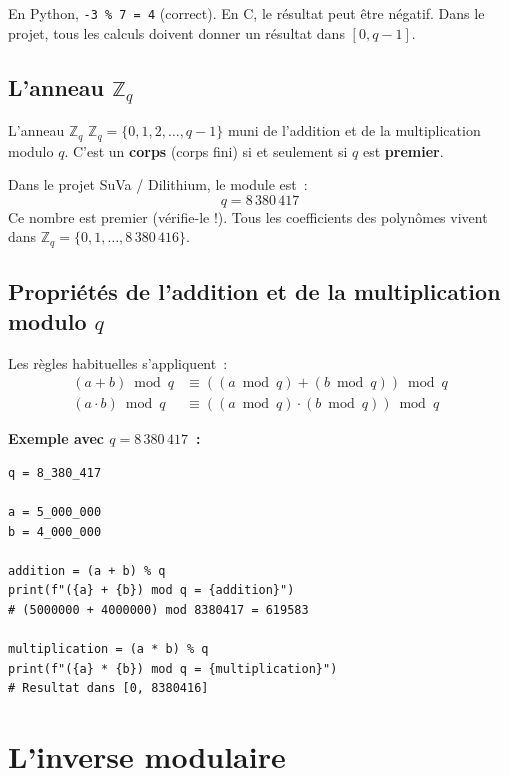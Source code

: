\documentclass[12pt, a4paper]{article}
\begin{document}
\begin{warningbox}
En Python, \texttt{-3 \% 7 = 4} (correct). En C, le résultat peut être négatif.
Dans le projet, tous les calculs doivent donner un résultat dans $[0, q-1]$.
\end{warningbox}

\subsection{L'anneau $\mathbb{Z}_q$}

\begin{defbox}{L'anneau $\mathbb{Z}_q$}
$\mathbb{Z}_q = \{0, 1, 2, \ldots, q-1\}$ muni de l'addition et de la
multiplication modulo $q$. C'est un \textbf{corps} (corps fini) si et
seulement si $q$ est \textbf{premier}.
\end{defbox}

\begin{importantbox}
Dans le projet SuVa / Dilithium, le module est~:
$$q = 8\,380\,417$$
Ce nombre est premier (vérifie-le !). Tous les coefficients des polynômes
vivent dans $\mathbb{Z}_q = \{0, 1, \ldots, 8\,380\,416\}$.
\end{importantbox}

\subsection{Propriétés de l'addition et de la multiplication modulo $q$}

Les règles habituelles s'appliquent~:
\begin{align*}
  (a + b) \bmod q &\equiv ((a \bmod q) + (b \bmod q)) \bmod q\\
  (a \cdot b) \bmod q &\equiv ((a \bmod q) \cdot (b \bmod q)) \bmod q
\end{align*}

\textbf{Exemple avec $q = 8\,380\,417$~:}
\begin{lstlisting}[style=python]
q = 8_380_417

a = 5_000_000
b = 4_000_000

addition = (a + b) % q
print(f"({a} + {b}) mod q = {addition}")
# (5000000 + 4000000) mod 8380417 = 619583

multiplication = (a * b) % q
print(f"({a} * {b}) mod q = {multiplication}")
# Resultat dans [0, 8380416]
\end{lstlisting}

\section{L'inverse modulaire}
\end{document}
